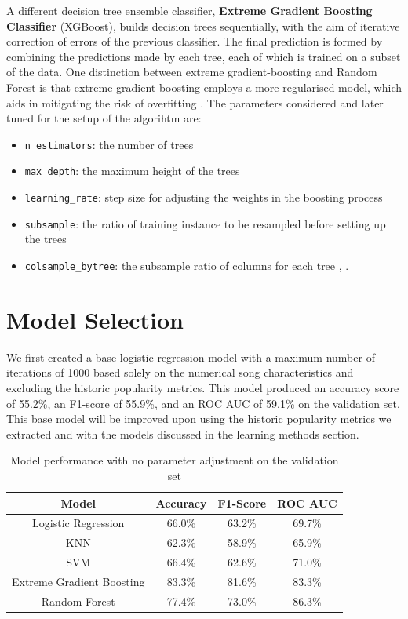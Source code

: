 \documentclass{article}
\begin{document}
A different decision tree ensemble classifier, \textbf{Extreme Gradient Boosting Classifier} (XGBoost), builds decision trees sequentially, with the aim of iterative correction of errors of the previous classifier. The final prediction is formed by combining the predictions made by each tree, each of which is trained on a subset of the data. One distinction between extreme gradient-boosting and Random Forest is that extreme gradient boosting employs a more regularised model, which aids in mitigating the risk of overfitting \cite{xgboost}. The parameters considered and later tuned for the setup of the algorihtm are: 

\begin{itemize}
  \item \texttt{{n\_estimators}}: the number of trees 
  \item \texttt{{max\_depth}}: the maximum height of the trees
  \item \texttt{{learning\_rate}}: step size for adjusting the weights in the boosting process
  \item \texttt{{subsample}}: the ratio of training instance to be resampled before setting up the trees
  \item \texttt{{colsample\_bytree}}: the subsample ratio of columns for each tree \cite{unknown}, \cite{xgboost_docu}.
\end{itemize}



\section{Model Selection}

We first created a base logistic regression model with a maximum number of iterations of 1000 based solely on the numerical song characteristics and excluding the historic popularity metrics. This model produced an accuracy score of 55.2\%, an F1-score of 55.9\%, and an ROC AUC of 59.1\% on the validation set. This base model will be improved upon using the historic popularity metrics we extracted and with the models discussed in the learning methods section. 


\begin{table}[h]
\centering
\caption{Model performance with no parameter adjustment on the validation set}\label{table: 1}
\begin{tabular}{|c|c|c|c|}
\hline
 Model & Accuracy & F1-Score & ROC AUC\\ 
\hline
 Logistic Regression & 66.0\% & 63.2\% & 69.7\% \\
 KNN & 62.3\% & 58.9\% & 65.9\% \\
 SVM & 66.4\% & 62.6\% & 71.0\% \\
 Extreme Gradient Boosting & 83.3\% & 81.6\% & 83.3\% \\
 Random Forest & 77.4\% & 73.0\% & 86.3\% \\
\hline
\end{tabular}
\end{table}
\end{document}
